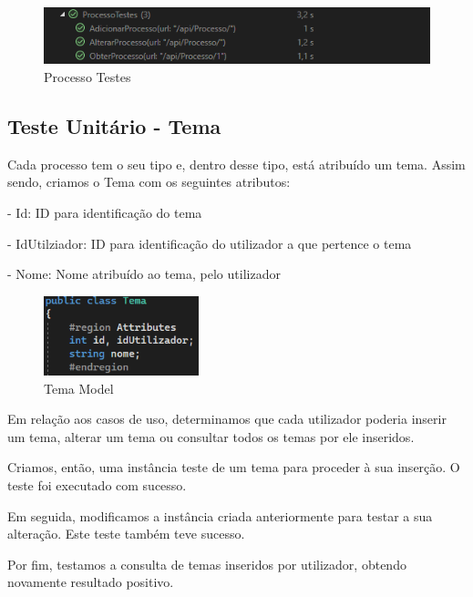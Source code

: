 \begin{figure}[!h]
\centering
\includegraphics[width=1\textwidth]{Figuras/Testes/ProcessoTestes.png}
\caption{Processo Testes}
\label{d.teste}
\end{figure}

\newpage


\subsection{Teste Unitário - Tema}
\indent \par Cada processo tem o seu tipo e, dentro desse tipo, está atribuído um tema. Assim sendo, criamos o Tema com os seguintes atributos:
\indent \par - Id: ID para identificação do tema 
\indent \par - IdUtilziador: ID para identificação do utilizador a que pertence o tema
\indent \par - Nome: Nome atribuído ao tema, pelo utilizador

\begin{figure}[!h]
\centering
\includegraphics[width=0.4\textwidth]{Figuras/Models/TemaModel.png}
\caption{Tema Model}
\label{d.model}
\end{figure}

\indent \par Em relação aos casos de uso, determinamos que cada utilizador poderia inserir um tema, alterar um tema ou consultar todos os temas por ele inseridos.
\indent \par Criamos, então, uma instância teste de um tema para proceder à sua inserção. O teste foi executado com sucesso.
\indent \par Em seguida, modificamos a instância criada anteriormente para testar a sua alteração. Este teste também teve sucesso.
\indent \par Por fim, testamos a consulta de temas inseridos por utilizador, obtendo novamente resultado positivo.


